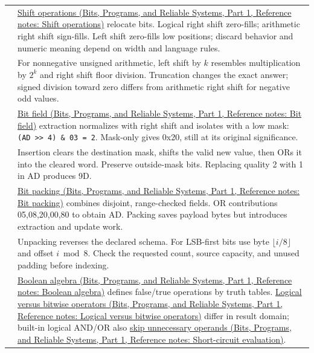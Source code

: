 {\begin{longtable}[]{@{}
  >{\raggedright\arraybackslash}p{}
  >{\raggedright\arraybackslash}p{}@{}}
13 & \href{../01-Bits-Programs-and-Reliable-Systems-P01/main.pdf\#nameddest=appendix-73425b25118e}{Shift operations (Bits, Programs, and Reliable Systems, Part 1, Reference notes: Shift operations)} relocate bits. Logical right shift zero-fills; arithmetic right shift sign-fills. Left shift zero-fills low positions; discard behavior and numeric meaning depend on width and language rules. \\
14 & For nonnegative unsigned arithmetic, left shift by \(k\) resembles multiplication by \(2^k\) and right shift floor division. Truncation changes the exact answer; signed division toward zero differs from arithmetic right shift for negative odd values. \\
15 & \href{../01-Bits-Programs-and-Reliable-Systems-P01/main.pdf\#nameddest=appendix-ac697f5c66e8}{Bit field (Bits, Programs, and Reliable Systems, Part 1, Reference notes: Bit field)} extraction normalizes with right shift and isolates with a low mask: \texttt{(AD\ \textgreater{}\textgreater{}\ 4)\ \&\ 03\ =\ 2}. Mask-only gives 0x20, still at its original significance. \\
16 & Insertion clears the destination mask, shifts the valid new value, then ORs it into the cleared word. Preserve outside-mask bits. Replacing quality 2 with 1 in AD produces 9D. \\
17 & \href{../01-Bits-Programs-and-Reliable-Systems-P01/main.pdf\#nameddest=appendix-1f9963e1a5d1}{Bit packing (Bits, Programs, and Reliable Systems, Part 1, Reference notes: Bit packing)} combines disjoint, range-checked fields. OR contributions 05,08,20,00,80 to obtain AD. Packing saves payload bytes but introduces extraction and update work. \\
18 & Unpacking reverses the declared schema. For LSB-first bits use byte \(\lfloor i/8\rfloor\) and offset \(i\bmod8\). Check the requested count, source capacity, and unused padding before indexing. \\
19 & \href{../01-Bits-Programs-and-Reliable-Systems-P01/main.pdf\#nameddest=appendix-24475e1596a8}{Boolean algebra (Bits, Programs, and Reliable Systems, Part 1, Reference notes: Boolean algebra)} defines false/true operations by truth tables. \href{../01-Bits-Programs-and-Reliable-Systems-P01/main.pdf\#nameddest=appendix-fe6b457d68d8}{Logical versus bitwise operators (Bits, Programs, and Reliable Systems, Part 1, Reference notes: Logical versus bitwise operators)} differ in result domain; built-in logical AND/OR also \href{../01-Bits-Programs-and-Reliable-Systems-P01/main.pdf\#nameddest=appendix-2e245a6fa8d3}{skip unnecessary operands (Bits, Programs, and Reliable Systems, Part 1, Reference notes: Short-circuit evaluation)}. \\

\end{longtable}}
